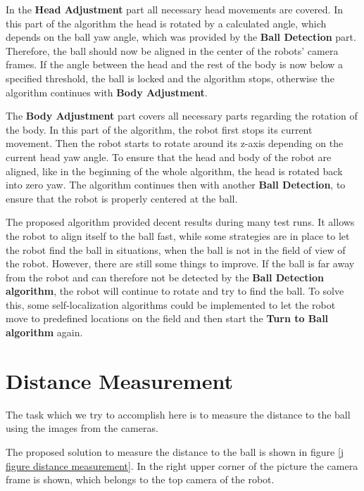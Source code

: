 In the \textbf{Head Adjustment} part all necessary head movements are covered.
In this part of the algorithm the head is rotated by a calculated angle, which
depends on the ball yaw angle, which was provided by the \textbf{Ball
  Detection} part. Therefore, the ball should now be aligned in the center of
the robots' camera frames. If the angle between the head and the rest of the
body is now below a specified threshold, the ball is locked and the algorithm
stops, otherwise the algorithm continues with \textbf{Body Adjustment}.

The \textbf{Body Adjustment} part covers all necessary parts regarding the
rotation of the body. In this part of the algorithm, the robot first stops its
current movement. Then the robot starts to rotate around its z-axis depending
on the current head yaw angle. To ensure that the head and body of the robot
are aligned, like in the beginning of the whole algorithm, the head is rotated
back into zero yaw. The algorithm continues then with another \textbf{Ball
  Detection}, to ensure that the robot is properly centered at the ball.

The proposed algorithm provided decent results during many test runs. It allows
the robot to align itself to the ball fast, while some strategies are in place
to let the robot find the ball in situations, when the ball is not in the
field of view of the robot. However, there are still some things to improve. If
the ball is far away from the robot and can therefore not be detected by the
\textbf{Ball Detection algorithm}, the robot will continue to rotate and try to
find the ball. To solve this, some self-localization algorithms could be
implemented to let the robot move to predefined locations on the field and then
start the \textbf{Turn to Ball algorithm} again.

\newpage
\section{Distance Measurement}
\label{j sec distance measurement}

The task which we try to accomplish here is to measure the distance to the ball
using the images from the cameras.

The proposed solution to measure the distance to the ball is shown in figure
\ref{j figure distance measurement}. In the right upper corner of the picture
the camera frame is shown, which belongs to the top camera of the robot.

